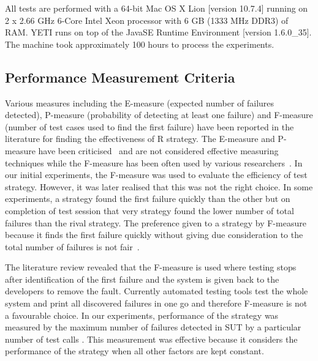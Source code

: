All tests are performed with a 64-bit Mac OS X Lion [version 10.7.4] running on 2 x 2.66 GHz 6-Core Intel Xeon processor with 6 GB (1333 MHz DDR3) of RAM. YETI runs on top of the Java\texttrademark  SE Runtime Environment [version 1.6.0\_35]. The machine took approximately 100 hours to process the experiments.


\subsection{Performance Measurement Criteria} \label{measurementCriteria_4}
Various measures including the E-measure (expected number of failures detected), P-measure (probability of detecting at least one failure) and F-measure (number of test cases used to find the first failure) have been reported in the literature for finding the effectiveness of R strategy. The E-measure and P-measure have been criticised~\cite{chen2005adaptive} and are not considered effective measuring techniques while the F-measure has been often used by various researchers~\cite{chen2004statistical, chen1996expected}. In our initial experiments, the F-measure was used to evaluate the efficiency of test strategy. However, it was later realised that this was not the right choice. In some experiments, a strategy found the first failure quickly than the other but on completion of test session that very strategy found the lower number of total failures than the rival strategy. The preference given to a strategy by F-measure because it finds the first failure quickly without giving due consideration to the total number of failures is not fair~\cite{liu2012comparison}.


  
The literature review revealed that the F-measure is used where testing stops after identification of the first failure and the system is given back to the developers to remove the fault. Currently automated testing tools test the whole system and print all discovered failures in one go and therefore F-measure is not a favourable choice. In our experiments, performance of the strategy was measured by the maximum number of failures detected in SUT by a particular number of test calls \cite{ciupa2007experimental, pacheco2007feedback, ciupa2008predictability}. This measurement was effective because it considers the performance of the strategy when all other factors are kept constant.



